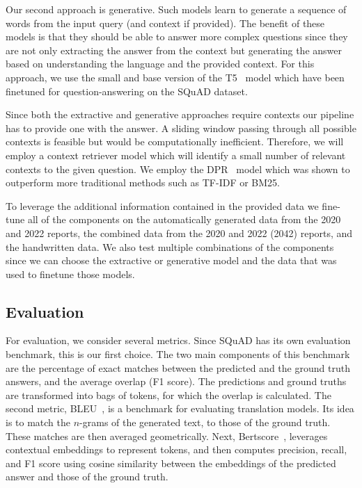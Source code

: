 \documentclass[fleqn,moreauthors,10pt]{ds_report}
\begin{document}
\noindent Our second approach is generative.
Such models learn to generate a sequence of words from the input query (and context if provided).
The benefit of these models is that they should be able to answer more complex questions since they are not only extracting the answer from the context but generating the answer based on understanding the language and the provided context.
For this approach, we use the small and base version of the T5~\cite{T5} model which have been finetuned for question-answering on the SQuAD dataset.

\noindent Since both the extractive and generative approaches require contexts our pipeline has to provide one with the answer.
A sliding window passing through all possible contexts is feasible but would be computationally inefficient.
Therefore, we will employ a context retriever model which will identify a small number of relevant contexts to the given question.
We employ the DPR~\cite{karpukhin2020dense} model which was shown to outperform more traditional methods such as TF-IDF or BM25.

\noindent To leverage the additional information contained in the provided data we fine-tune all of the components on the automatically generated data from the 2020 and 2022 reports, the combined data from the 2020 and 2022 (2042) reports, and the handwritten data.
We also test multiple combinations of the components since we can choose the extractive or generative model and the data that was used to finetune those models.

\subsection*{Evaluation}
For evaluation, we consider several metrics. Since SQuAD has its own evaluation benchmark, this is our first choice. 
The two main components of this benchmark are the percentage of exact matches between the predicted and the ground truth answers, and the average overlap (F1 score). 
The predictions and ground truths are transformed into bags of tokens, for which the overlap is calculated.
The second metric, BLEU~\cite{papineni2002bleu}, is a benchmark for evaluating translation models.
Its idea is to match the $n$-grams of the generated text, to those of the ground truth. These matches are then averaged geometrically.
Next, Bertscore~\cite{zhang2019bertscore}, leverages contextual embeddings to represent tokens, and then computes precision, recall, and F1 score using cosine similarity between the embeddings of the predicted answer and those of the ground truth.
\end{document}
